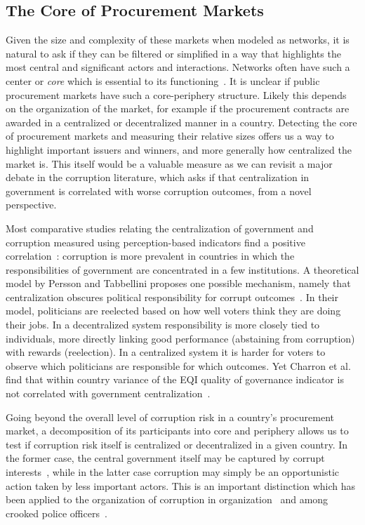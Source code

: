 \subsection{The Core of Procurement Markets}
Given the size and complexity of these markets when modeled as networks, it is natural to ask if they can be filtered or simplified in a way that highlights the most central and significant actors and interactions. Networks often have such a center or \textit{core} which is essential to its functioning~\cite{csermely2013structure}. It is unclear if public procurement markets have such a core-periphery structure. Likely this depends on the organization of the market, for example if the procurement contracts are awarded in a centralized or decentralized manner in a country. Detecting the core of procurement markets and measuring their relative sizes offers us a way to highlight important issuers and winners, and more generally how centralized the market is. This itself would be a valuable measure as we can revisit a major debate in the corruption literature, which asks if that centralization in government is correlated with worse corruption outcomes, from a novel perspective.

Most comparative studies relating the centralization of government and corruption measured using perception-based indicators find a positive correlation~\cite{fisman2002decentralization,gurgur2005localization}: corruption is more prevalent in countries in which the responsibilities of government are concentrated in a few institutions. A theoretical model by Persson and Tabbellini proposes one possible mechanism, namely that centralization obscures political responsibility for corrupt outcomes~\cite{persson2002political}. In their model, politicians are reelected based on how well voters think they are doing their jobs. In a decentralized system responsibility is more closely tied to individuals, more directly linking good performance (abstaining from corruption) with rewards (reelection). In a centralized system it is harder for voters to observe which politicians are responsible for which outcomes. Yet Charron et al. find that within country variance of the EQI quality of governance indicator is not correlated with government centralization~\cite{charron2014regional}.

Going beyond the overall level of corruption risk in a country's procurement market, a decomposition of its participants into core and periphery allows us to test if corruption risk itself is centralized or decentralized in a given country. In the former case, the central government itself may be captured by corrupt interests~\cite{fazekas2017networks}, while in the latter case corruption may simply be an opportunistic action taken by less important actors. This is an important distinction which has been applied to the organization of corruption in organization~\cite{pinto2008corrupt} and among crooked police officers~\cite{lauchs2012resilience}.


